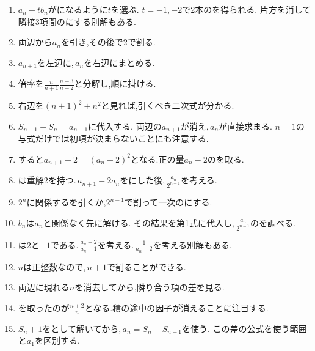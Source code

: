 \begin{enumerate}[label=\textbf{問\arabic*.},leftmargin=3.8em,format=\bookitemlink{practice-basic}{hint}{problem}]
          \item $a_n+t b_n$がになるように$t$を選ぶ. $t=-1,-2$で2本のを得られる. 片方を消して隣接3項間のにする別解もある.
          \item 両辺から$a_n$を引き,その後で$2$で割る.
          \item $a_{n+1}$を左辺に,\,$a_n$を右辺にまとめる.
          \item 倍率を$\displaystyle \frac{n}{n+1}\frac{n+3}{n+2}$と分解し,順に掛ける.
          \item 右辺を$(n+1)^2+n^2$と見れば,引くべき二次式が分かる.
          \item $S_{n+1}-S_n=a_{n+1}$に代入する. 両辺の$a_{n+1}$が消え,\,$a_n$が直接求まる. $n=1$の与式だけでは初項が決まらないことにも注意する.
          \item {}すると$a_{n+1}-2=(a_n-2)^2$となる.正の量$a_n-2$のを取る.
          \item {}は重解$2$を持つ.\,$a_{n+1}-2a_n$をにした後,\,$\displaystyle \frac{a_n}{2^{n-1}}$を考える.
          \item $2^n$に関係するを引くか,$2^{n-1}$で割って一次のにする.
          \item $b_n$は$a_n$と関係なく先に解ける. その結果を第1式に代入し,\,$\displaystyle \frac{a_n}{2^{n-1}}$のを調べる.
          \item {}は$2$と$-1$である.\,$\displaystyle \frac{a_n-2}{a_n+1}$を考える.\,$\displaystyle \frac{1}{a_n-2}$を考える別解もある.
          \item $n$は正整数なので,\,$n+1$で割ることができる.
          \item 両辺に現れる$n$を消去してから,隣り合う項の差を見る.
          \item {}を取ったのが$\displaystyle \frac{n+2}{n}$となる.積の途中の因子が消えることに注目する.
          \item $S_n+1$をとして解いてから,\,$a_n=S_n-S_{n-1}$を使う. この差の公式を使う範囲と$a_1$を区別する.

\end{enumerate}

